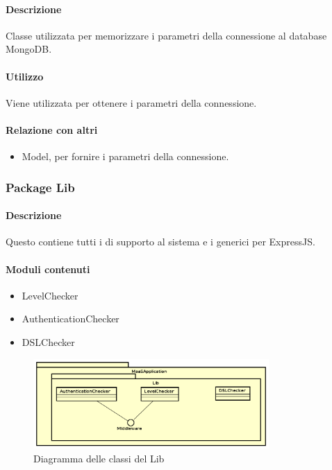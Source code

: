 \paragraph*{Descrizione}
Classe utilizzata per memorizzare i parametri della connessione al database MongoDB.

\paragraph*{Utilizzo}
Viene utilizzata per ottenere i parametri della connessione.

\paragraph*{Relazione con altri }
\begin{itemize}
\item Model, per fornire i parametri della connessione.
\end{itemize}

\subsubsection{Package Lib}
\paragraph*{Descrizione}
Questo  contiene tutti i  di supporto al sistema e i  generici per ExpressJS.

\paragraph*{Moduli contenuti}
\begin{itemize}
\item LevelChecker
\item AuthenticationChecker
\item DSLChecker
\end{itemize}


\begin{figure}[H]
\centering
\includegraphics[width=0.8\textwidth]{res/sections/backend/lib.png}
\caption{Diagramma delle classi del  Lib}
\end{figure}

